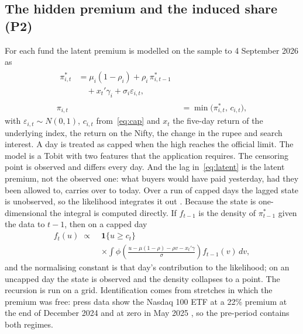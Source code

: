 \subsection{The hidden premium and the induced share (P2)}
For each fund the latent premium is modelled on the sample to 4 September 2026 as
\begin{align}
\begin{split}\pi^{*}_{i,t}&=\mu_i(1-\rho_i)+\rho_i\,\pi^{*}_{i,t-1}\\&\quad+x_t'\gamma_i+\sigma_i\varepsilon_{i,t},\end{split}\label{eq:latent}\\
\pi_{i,t}&=\min\big(\pi^{*}_{i,t},\,c_{i,t}\big),\label{eq:obs}
\end{align}
with $\varepsilon_{i,t}\sim N(0,1)$, $c_{i,t}$ from~\eqref{eq:cap} and $x_t$ the five-day return of the underlying index, the return on the Nifty, the change in the rupee and search interest. A day is treated as capped when the high reaches the official limit. The model is a Tobit \citep{tobin1958estimation} with two features that the application requires. The censoring point is observed and differs every day. And the lag in~\eqref{eq:latent} is the latent premium, not the observed one: what buyers would have paid yesterday, had they been allowed to, carries over to today. Over a run of capped days the lagged state is unobserved, so the likelihood integrates it out \citep{lee1999estimation}. Because the state is one-dimensional the integral is computed directly. If $f_{t-1}$ is the density of $\pi^{*}_{t-1}$ given the data to $t-1$, then on a capped day
\begin{equation}\label{eq:filter}
\begin{split}f_{t}(u)\;\propto\;&\mathbf{1}\{u\ge c_{t}\}\\&\times\int\phi\!\left(\frac{u-\mu(1-\rho)-\rho v-x_t'\gamma}{\sigma}\right)f_{t-1}(v)\,dv ,\end{split}
\end{equation}
and the normalising constant is that day's contribution to the likelihood; on an uncapped day the state is observed and the density collapses to a point. The recursion is run on a grid. Identification comes from stretches in which the premium was free: press data show the Nasdaq 100 ETF at a 22\% premium at the end of December 2024 and at zero in May 2025 \citep{vr2025premium}, so the pre-period contains both regimes.

